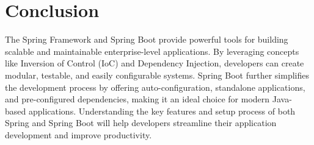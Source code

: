 \documentclass{article}
\begin{document}
\section{Conclusion}

The Spring Framework and Spring Boot provide powerful tools for building scalable and maintainable enterprise-level applications. By leveraging concepts like Inversion of Control (IoC) and Dependency Injection, developers can create modular, testable, and easily configurable systems. Spring Boot further simplifies the development process by offering auto-configuration, standalone applications, and pre-configured dependencies, making it an ideal choice for modern Java-based applications. Understanding the key features and setup process of both Spring and Spring Boot will help developers streamline their application development and improve productivity.
\end{document}
